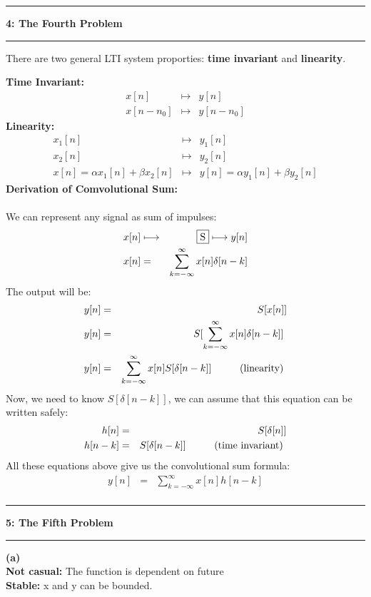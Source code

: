 \documentclass[11pt]{article}
\newcommand\question[2]{\vspace{.25in}\hrule\textbf{#1: #2}\vspace{.5em}\hrule\vspace{.10in}}
\renewcommand\part[1]{\vspace{.10in}\textbf{(#1)}}
\newcommand\tab[1][1cm]{\hspace*{#1}}
\begin{document}
\question{4}{The Fourth Problem} 

There are two general LTI system proporties: \textbf{time invariant} and \textbf{linearity}.

\textbf{Time Invariant:}
\begin{eqnarray*}
	x[n] & \longmapsto & y[n] \\
	x[n-n_0] & \longmapsto & y[n-n_0]
\end{eqnarray*}
\textbf{Linearity:}
\begin{eqnarray*}
	x_1[n] & \longmapsto & y_1[n] \\
	x_2[n] & \longmapsto & y_2[n] \\
	x[n]=\alpha x_1[n]+\beta x_2[n] & \longmapsto & y[n]=\alpha y_1[n]+\beta y_2[n]
\end{eqnarray*}
\textbf{Derivation of Comvolutional Sum:} \\
\tab \\
\tab We can represent any signal as sum of impulses:
\begin{eqnarray*}
	x[n] & \longmapsto & \framebox{S}  \longmapsto y[n] \\
	x[n] & = & \sum_{k=-\infty}^{\infty} x[n]\delta[n-k] \\
\end{eqnarray*}
\tab The output will be:
\begin{eqnarray*}
	y[n] & = & S[x[n]]\\
	y[n] & = & S[\sum_{k=-\infty}^{\infty} x[n]\delta[n-k]] \\
	y[n] & = & \sum_{k=-\infty}^{\infty} x[n]S[\delta[n-k]] \tab \text{(linearity)} \\
\end{eqnarray*}
\tab Now, we need to know $S[\delta[n-k]]$, we can assume that this equation can be written safely:
\begin{eqnarray*}
	h[n] & = & S[\delta[n]]\\
	h[n-k] & = & S[\delta[n-k]] \tab \text{(time invariant)} \\
\end{eqnarray*}
\tab All these equations above give us the convolutional sum formula:
\begin{eqnarray*}
	y[n] & = & \sum_{k=-\infty}^{\infty} x[n]h[n-k] \\
\end{eqnarray*}


\question{5}{The Fifth Problem} 

\part{a} \\
\tab \textbf{Not casual:} The function is dependent on future \\
\tab \textbf{Stable:} x and y can be bounded.
\end{document}
